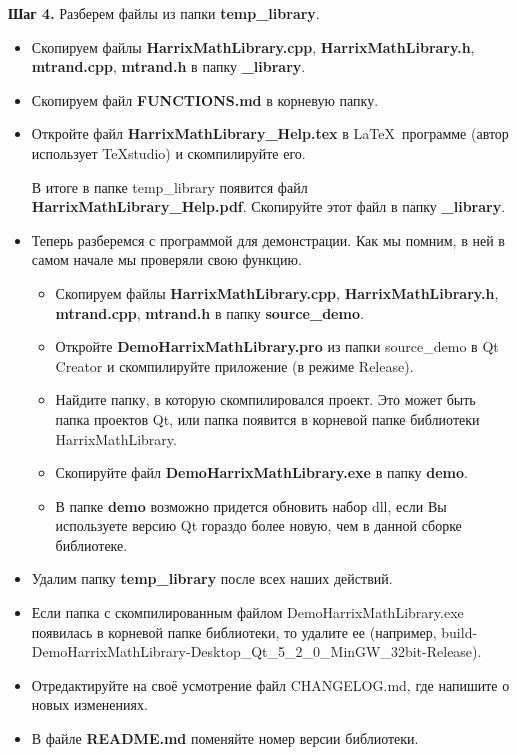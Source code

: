 \documentclass[a4paper,12pt]{article}
\begin{document}
\textbf{Шаг 4.}\label{step4} Разберем файлы из папки \textbf{temp\_library}.

\begin{itemize}
\item Скопируем файлы \textbf{HarrixMathLibrary.cpp}, \textbf{HarrixMathLibrary.h}, \textbf{mtrand.cpp}, \textbf{mtrand.h} в папку \textbf{\_library}.

\item Скопируем файл \textbf{FUNCTIONS.md} в корневую папку.

\item Откройте файл \textbf{HarrixMathLibrary\_Help.tex } в \LaTeX \ программе (автор использует TeXstudio) и скомпилируйте его.

В итоге в папке temp\_library появится файл \textbf{HarrixMathLibrary\_Help.pdf}. Скопируйте этот файл в папку \textbf{\_library}.

\item Теперь разберемся с программой для демонстрации. Как мы помним, в ней в самом начале мы проверяли свою функцию. 
\begin{itemize}
\item Скопируем файлы \textbf{HarrixMathLibrary.cpp}, \textbf{HarrixMathLibrary.h}, \textbf{mtrand.cpp}, \textbf{mtrand.h} в папку \textbf{source\_demo}.
\item  Откройте \textbf{DemoHarrixMathLibrary.pro} из папки source\_demo в Qt Creator и скомпилируйте приложение (в режиме Release).
\item Найдите папку, в которую скомпилировался проект. Это может быть папка проектов Qt, или папка появится в корневой папке библиотеки HarrixMathLibrary.
\item Скопируйте файл \textbf{DemoHarrixMathLibrary.exe} в папку \textbf{demo}.
\item В папке \textbf{demo} возможно придется обновить набор dll, если Вы используете версию Qt гораздо более новую, чем в данной сборке библиотеке.
\end{itemize}
\item Удалим папку \textbf{temp\_library} после всех наших действий.
\item  Если папка с скомпилированным файлом DemoHarrixMathLibrary.exe появилась в корневой папке библиотеки, то удалите ее (например, build-DemoHarrixMathLibrary-Desktop\_Qt\_5\_2\_0\_MinGW\_32bit-Release).
\item Отредактируйте на своё усмотрение файл CHANGELOG.md, где напишите о новых изменениях.
\item В файле \textbf{README.md} поменяйте номер версии библиотеки.
\end{itemize}
\end{document}
